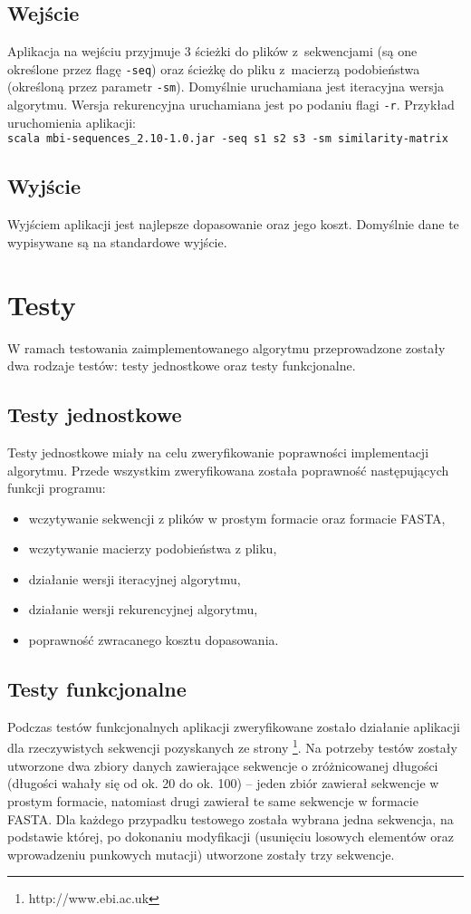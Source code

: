 \documentclass[12pt, a4paper]{article}
\begin{document}
	\subsection{Wejście}
	Aplikacja na wejściu przyjmuje 3 ścieżki do plików z~sekwencjami (są one określone przez flagę \texttt{-seq}) oraz ścieżkę do pliku z~macierzą podobieństwa (określoną przez parametr \texttt{-sm}). Domyślnie uruchamiana jest iteracyjna wersja algorytmu. Wersja rekurencyjna uruchamiana jest po podaniu flagi \texttt{-r}.
	Przykład uruchomienia aplikacji: \\
	\texttt{scala mbi-sequences\_2.10-1.0.jar -seq s1 s2 s3 -sm similarity-matrix}
	\subsection{Wyjście}
	Wyjściem aplikacji jest najlepsze dopasowanie oraz jego koszt. Domyślnie dane te wypisywane są na standardowe wyjście.
	
\section{Testy}
W ramach testowania zaimplementowanego algorytmu przeprowadzone zostały dwa rodzaje testów: testy jednostkowe oraz testy funkcjonalne.
	\subsection{Testy jednostkowe}
	Testy jednostkowe miały na celu zweryfikowanie poprawności implementacji algorytmu. Przede wszystkim zweryfikowana została poprawność następujących funkcji programu:
	\begin{itemize}
		\item wczytywanie sekwencji z plików w prostym formacie oraz formacie FASTA,
		\item wczytywanie macierzy podobieństwa z pliku,
		\item działanie wersji iteracyjnej algorytmu,
		\item działanie wersji rekurencyjnej algorytmu,
		\item poprawność zwracanego kosztu dopasowania.
	\end{itemize}
	
	\subsection{Testy funkcjonalne}
	Podczas testów funkcjonalnych aplikacji zweryfikowane zostało działanie aplikacji dla rzeczywistych sekwencji pozyskanych ze strony \footnote{http://www.ebi.ac.uk}.
	Na potrzeby testów zostały utworzone dwa zbiory danych zawierające sekwencje o zróżnicowanej długości (długości wahały się od ok. 20 do ok. 100) -- jeden zbiór zawierał sekwencje w prostym formacie, natomiast drugi zawierał te same sekwencje w formacie FASTA. Dla każdego przypadku testowego została wybrana jedna sekwencja, na podstawie której, po dokonaniu modyfikacji (usunięciu losowych elementów oraz wprowadzeniu punkowych mutacji) utworzone zostały trzy sekwencje.
	
\end{document}
